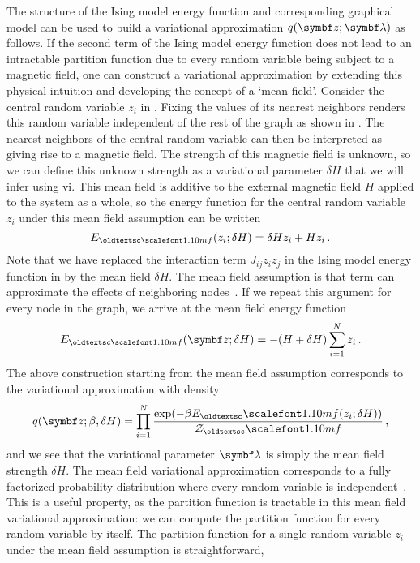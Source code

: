 
The structure of the Ising model energy function and corresponding graphical model can be used to build a variational approximation $q(\mbz; \mblambda)$ as follows. If the second term of the Ising model energy function does not lead to an intractable partition function due to every random variable being subject to a magnetic field, one can construct a variational approximation by extending this physical intuition and developing the concept of a `mean field'. Consider the central random variable $z_i$ in . Fixing the values of its nearest neighbors renders this random variable independent of the rest of the graph as shown in . The nearest neighbors of the central random variable can then be interpreted as giving rise to a magnetic field. The strength of this magnetic field is unknown, so we can define this unknown strength as a variational parameter $\delta H$ that we will infer using \gls{vi}. This mean field is additive to the external magnetic field $H$ applied to the system as a whole, so the energy function for the central random variable $z_i$ under this mean field assumption can be written
\begin{equation}
  E_{\mf}(z_i; \delta H) = \delta H z_i + H z_i\, .
\end{equation}
Note that we have replaced the interaction term $J_{ij} z_iz_j$ in the Ising model energy function in  by the mean field $\delta H$. The mean field assumption is that term can approximate the effects of neighboring nodes~\citep{chandler1987introduction}. If we repeat this argument for every node in the graph, we arrive at the mean field energy function
\begin{equation}
  E_{\mf}(\mbz; \delta H) = -(H + \delta H)\sum_{i = 1}^N z_i\, .
  \label{eq:mean-field-energy}
\end{equation}
The above construction starting from the mean field assumption corresponds to the variational approximation with density
\begin{equation}
  q(\mbz; \beta, \delta H) = \prod_{i=1}^N\frac{\exp(- \beta E_\mf(z_i; \delta H))}{\cZ_\mf} \, ,
  \label{eq:mean-field-distribution}
\end{equation}
and we see that the variational parameter $\mblambda$ is simply the mean field strength $\delta H$. The mean field variational approximation corresponds to a fully factorized probability distribution where every random variable is independent~\citep{wainwright2008graphical}. This is a useful property, as the partition function is tractable in this mean field variational approximation: we can compute the partition function for every random variable by itself. The partition function for a single random variable $z_i$ under the mean field assumption is straightforward,
